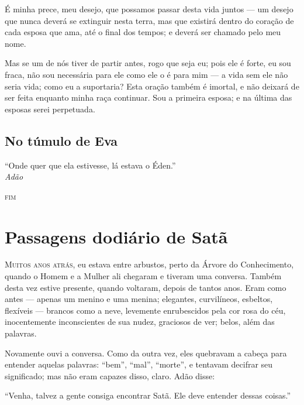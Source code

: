 É minha prece, meu desejo, que possamos passar desta vida juntos --- um desejo
que nunca deverá se extinguir nesta terra, mas que existirá dentro do
coração de cada esposa que ama, até o final dos tempos; e deverá ser chamado pelo
meu nome.

Mas se um de nós tiver de partir antes, rogo que seja eu; pois ele é forte, eu
sou fraca, não sou necessária para ele como ele o é para mim --- a
vida sem ele não seria vida; como eu a suportaria? Esta oração também é
imortal, e não deixará de ser feita enquanto minha raça continuar. Sou a
primeira esposa; e na última das esposas serei perpetuada.

\begin{center}
\leafNE
\end{center}

\section{No túmulo de Eva}
\medskip

``Onde quer que ela estivesse, lá estava o Éden.''
\\

\hfill\textit{Adão}  

\begin{center}
\textsc{fim}
\end{center}




\chapter[Passagens do diário de Satã]{Passagens do\break diário de Satã}

\textsc{Muitos anos atrás,} eu estava entre arbustos, perto da Árvore do
Conhecimento, quando o Homem e a Mulher ali chegaram e tiveram uma
conversa. Também desta vez estive presente, quando voltaram,
depois de tantos anos. Eram como antes --- apenas um menino e uma menina;
elegantes, curvilíneos, esbeltos, flexíveis --- brancos
como a neve, levemente enrubescidos pela cor rosa do céu, inocentemente
inconscientes de sua nudez, graciosos de ver; belos,
além das palavras.

Novamente ouvi a conversa. Como da outra vez, eles quebravam a cabeça
para entender aquelas palavras: ``bem'', ``mal'', ``morte'', e
tentavam decifrar seu significado; mas não eram capazes disso,
claro. Adão disse:

“Venha, talvez a gente consiga encontrar Satã. Ele deve entender dessas coisas.”

